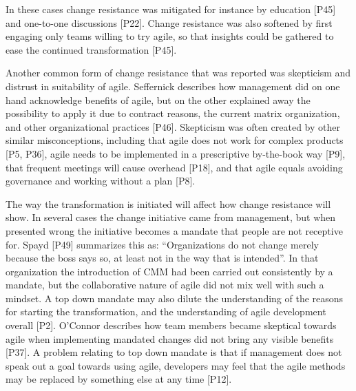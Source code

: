 \documentclass[preprint,authoryear,12pt]{elsarticle}
\begin{document}
In these cases change resistance was mitigated for instance by education [P45]
and one-to-one discussions [P22]. Change resistance was also softened by first
engaging only teams willing to try agile, so that insights could be gathered to
ease the continued transformation [P45].

Another common form of change resistance that was reported was skepticism and
distrust in suitability of agile. Seffernick describes how management did on one hand
acknowledge benefits of agile, but on the other explained away the possibility
to apply it due to contract reasons, the current matrix organization, and other
organizational practices [P46]. Skepticism was often created by other similar
misconceptions, including that agile does not work for complex products [P5,
P36], agile needs to be implemented in a prescriptive by-the-book way [P9], that
frequent meetings will cause overhead [P18], and that agile equals avoiding
governance and working without a plan [P8].




The way the transformation is initiated will affect how change resistance will
show. In several cases the change initiative came from management, but when
presented wrong the initiative becomes a mandate that people are not receptive
for. Spayd [P49] summarizes this as: ``Organizations do not change merely
because the boss says so, at least not in the way that is intended''. In that
organization the introduction of CMM had been carried out consistently by a
mandate, but the collaborative nature of agile did not mix well with such a
mindset. A top down mandate may also dilute the understanding of the reasons for
starting the transformation, and the understanding of agile development overall
[P2]. O'Connor describes how team members became skeptical towards agile when
implementing mandated changes did not bring any visible benefits [P37].
A problem relating to top down mandate is that if management does not speak out
a goal towards using agile, developers may feel that the agile methods may be
replaced by something else at any time [P12].
\end{document}
